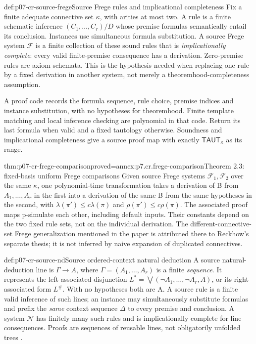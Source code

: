 \begin{hbdefinition}{def:p07-cr-source-frege}{Source Frege rules and implicational completeness}
Fix a finite adequate connective set \(\kappa\), with arities at
most two. A rule is a finite schematic inference
\((C_1,\ldots,C_r)/D\) whose premise formulas semantically entail
its conclusion. Instances use simultaneous formula substitution.
A source Frege system \(\mathcal F\) is a finite collection of
these sound rules that is \emph{implicationally complete}: every
valid finite-premise consequence has a derivation. Zero-premise
rules are axiom schemata. This is the hypothesis needed when replacing
one rule by a fixed derivation in another system, not merely a
theoremhood-completeness assumption.

A proof code records the formula sequence, rule choice, premise
indices and instance substitution, with no hypotheses for theoremhood.
Finite template matching and local inference checking are polynomial
in that code. Return its last formula when valid and a fixed tautology
otherwise. Soundness and implicational completeness give a source
proof map with exactly \(\mathsf{TAUT}_\kappa\) as its range.
\end{hbdefinition}

\begin{hbtheorem}{thm:p07-cr-frege-comparison}{proved=annex:p7.cr.frege-comparison}{Theorem 2.3: fixed-basis uniform Frege comparisons}
Given source Frege systems \(\mathcal F_1,\mathcal F_2\) over
the same \(\kappa\), one polynomial-time transformation takes a
derivation of B from \(A_1,\ldots,A_r\) in the first into a
derivation of the same B from the same hypotheses in the second,
with \(\lambda(\pi')\leq c\lambda(\pi)\) and
\(\rho(\pi')\leq c\rho(\pi)\). The associated proof maps
p-simulate each other, including default inputs. Their constants
depend on the two fixed rule sets, not on the individual derivation.
The different-connective-set Frege generalization mentioned in the
paper is attributed there to Reckhow's separate thesis; it is not
inferred by naive expansion of duplicated connectives.
\end{hbtheorem}

\begin{hbdefinition}{def:p07-cr-source-nd}{Source ordered-context natural deduction}
A source natural-deduction line is \(\Gamma\to A\), where
\(\Gamma=(A_1,\ldots,A_r)\) is a finite \emph{sequence}.
It represents the left-associated disjunction
\(L^*=\bigvee(\neg A_1,\ldots,\neg A_r,A)\), or its
right-associated form \(L^\#\). With no hypotheses both are A.
A source rule is a finite valid inference of such lines; an instance
may simultaneously substitute formulas and prefix the \emph{same}
context sequence \(\Delta\) to every premise and conclusion.
A system \(\mathcal N\) has finitely many such rules and is
implicationally complete for line consequences. Proofs are sequences
of reusable lines, not obligatorily unfolded trees
\cite[\S3]{CookReckhow1979}.
\end{hbdefinition}

